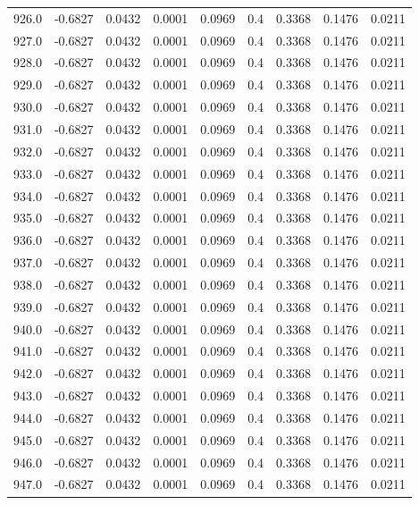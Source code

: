 \begin{longtable}{lrrrrrrrr}
926.0 & -0.6827 & 0.0432 & 0.0001 & 0.0969 & 0.4 & 0.3368 & 0.1476 & 0.0211 \\
927.0 & -0.6827 & 0.0432 & 0.0001 & 0.0969 & 0.4 & 0.3368 & 0.1476 & 0.0211 \\
928.0 & -0.6827 & 0.0432 & 0.0001 & 0.0969 & 0.4 & 0.3368 & 0.1476 & 0.0211 \\
929.0 & -0.6827 & 0.0432 & 0.0001 & 0.0969 & 0.4 & 0.3368 & 0.1476 & 0.0211 \\
930.0 & -0.6827 & 0.0432 & 0.0001 & 0.0969 & 0.4 & 0.3368 & 0.1476 & 0.0211 \\
931.0 & -0.6827 & 0.0432 & 0.0001 & 0.0969 & 0.4 & 0.3368 & 0.1476 & 0.0211 \\
932.0 & -0.6827 & 0.0432 & 0.0001 & 0.0969 & 0.4 & 0.3368 & 0.1476 & 0.0211 \\
933.0 & -0.6827 & 0.0432 & 0.0001 & 0.0969 & 0.4 & 0.3368 & 0.1476 & 0.0211 \\
934.0 & -0.6827 & 0.0432 & 0.0001 & 0.0969 & 0.4 & 0.3368 & 0.1476 & 0.0211 \\
935.0 & -0.6827 & 0.0432 & 0.0001 & 0.0969 & 0.4 & 0.3368 & 0.1476 & 0.0211 \\
936.0 & -0.6827 & 0.0432 & 0.0001 & 0.0969 & 0.4 & 0.3368 & 0.1476 & 0.0211 \\
937.0 & -0.6827 & 0.0432 & 0.0001 & 0.0969 & 0.4 & 0.3368 & 0.1476 & 0.0211 \\
938.0 & -0.6827 & 0.0432 & 0.0001 & 0.0969 & 0.4 & 0.3368 & 0.1476 & 0.0211 \\
939.0 & -0.6827 & 0.0432 & 0.0001 & 0.0969 & 0.4 & 0.3368 & 0.1476 & 0.0211 \\
940.0 & -0.6827 & 0.0432 & 0.0001 & 0.0969 & 0.4 & 0.3368 & 0.1476 & 0.0211 \\
941.0 & -0.6827 & 0.0432 & 0.0001 & 0.0969 & 0.4 & 0.3368 & 0.1476 & 0.0211 \\
942.0 & -0.6827 & 0.0432 & 0.0001 & 0.0969 & 0.4 & 0.3368 & 0.1476 & 0.0211 \\
943.0 & -0.6827 & 0.0432 & 0.0001 & 0.0969 & 0.4 & 0.3368 & 0.1476 & 0.0211 \\
944.0 & -0.6827 & 0.0432 & 0.0001 & 0.0969 & 0.4 & 0.3368 & 0.1476 & 0.0211 \\
945.0 & -0.6827 & 0.0432 & 0.0001 & 0.0969 & 0.4 & 0.3368 & 0.1476 & 0.0211 \\
946.0 & -0.6827 & 0.0432 & 0.0001 & 0.0969 & 0.4 & 0.3368 & 0.1476 & 0.0211 \\
947.0 & -0.6827 & 0.0432 & 0.0001 & 0.0969 & 0.4 & 0.3368 & 0.1476 & 0.0211 \\

\end{longtable}
